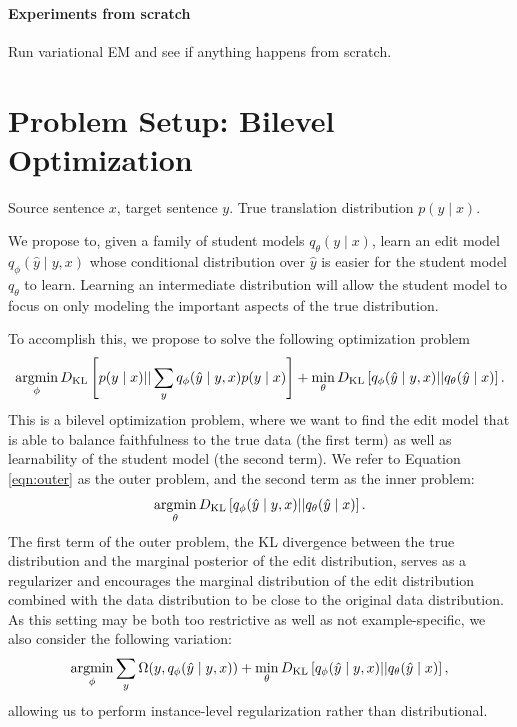 \documentclass[11pt]{article}
\begin{document}
\paragraph{Experiments from scratch}
Run variational EM and see if anything happens from scratch.

\section{Problem Setup: Bilevel Optimization}
Source sentence $x$, target sentence $y$.
True translation distribution $p(y \mid x)$.

We propose to, given a family of student models $q_\theta(y \mid x)$,
learn an edit model $q_\phi(\hat{y} \mid y, x)$ whose conditional distribution over $\hat{y}$
is easier for the student model $q_\theta$ to learn.
Learning an intermediate distribution will allow the student model to focus on only modeling
the important aspects of the true distribution.

To accomplish this, we propose to solve the following optimization problem
\begin{equation}
    \label{eqn:outer}
    \operatorname*{argmin}_\phi D_\mathrm{KL}\left[p(y \mid x) || \sum_y q_\phi(\hat{y} \mid y, x)p(y \mid x)\right]
    + \min_\theta D_\mathrm{KL}\left[q_\phi(\hat{y} \mid y, x) || q_\theta(\hat{y} \mid x)\right].
\end{equation}
This is a bilevel optimization problem, where we want to find the edit model
that is able to balance faithfulness to the true data (the first term)
as well as learnability of the student model (the second term).
We refer to Equation \ref{eqn:outer} as the outer problem,
and the second term as the inner problem:
\begin{equation}
    \label{eqn:inner}
    \operatorname*{argmin}_\theta D_\mathrm{KL}\left[q_\phi(\hat{y} \mid y, x) || q_\theta(\hat{y} \mid x)\right].
\end{equation}
The first term of the outer problem, the KL divergence between the true distribution
and the marginal posterior of the edit distribution,
serves as a regularizer and encourages the marginal distribution of
the edit distribution combined with the data distribution to be close to the
original data distribution.
As this setting may be both too restrictive as well as not example-specific,
we also consider the following variation:
\begin{equation}
    \label{eqn:regularized-bilevel}
    \operatorname*{argmin}_\phi \sum_y \Omega(y, q_\phi(\hat{y} \mid y, x))
    + \min_\theta D_\mathrm{KL}\left[q_\phi(\hat{y} \mid y, x) || q_\theta(\hat{y} \mid x)\right],
\end{equation}
allowing us to perform instance-level regularization rather than distributional.
\end{document}
